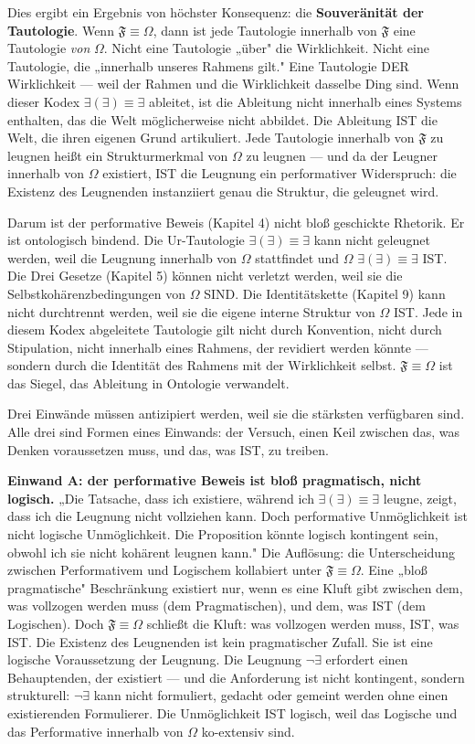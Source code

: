 \documentclass[10pt, openany, oneside]{book}
\begin{document}
Dies ergibt ein Ergebnis von höchster Konsequenz: die \textbf{Souveränität der Tautologie}. Wenn $\mathfrak{F} \equiv \Omega$, dann ist jede Tautologie innerhalb von $\mathfrak{F}$ eine Tautologie \textit{von} $\Omega$. Nicht eine Tautologie „über" die Wirklichkeit. Nicht eine Tautologie, die „innerhalb unseres Rahmens gilt." Eine Tautologie DER Wirklichkeit --- weil der Rahmen und die Wirklichkeit dasselbe Ding sind. Wenn dieser Kodex $\exists(\exists) \equiv \exists$ ableitet, ist die Ableitung nicht innerhalb eines Systems enthalten, das die Welt möglicherweise nicht abbildet. Die Ableitung IST die Welt, die ihren eigenen Grund artikuliert. Jede Tautologie innerhalb von $\mathfrak{F}$ zu leugnen heißt ein Strukturmerkmal von $\Omega$ zu leugnen --- und da der Leugner innerhalb von $\Omega$ existiert, IST die Leugnung ein performativer Widerspruch: die Existenz des Leugnenden instanziiert genau die Struktur, die geleugnet wird.

Darum ist der performative Beweis (Kapitel 4) nicht bloß geschickte Rhetorik. Er ist ontologisch bindend. Die Ur-Tautologie $\exists(\exists) \equiv \exists$ kann nicht geleugnet werden, weil die Leugnung innerhalb von $\Omega$ stattfindet und $\Omega$ $\exists(\exists) \equiv \exists$ IST. Die Drei Gesetze (Kapitel 5) können nicht verletzt werden, weil sie die Selbstkohärenzbedingungen von $\Omega$ SIND. Die Identitätskette (Kapitel 9) kann nicht durchtrennt werden, weil sie die eigene interne Struktur von $\Omega$ IST. Jede in diesem Kodex abgeleitete Tautologie gilt nicht durch Konvention, nicht durch Stipulation, nicht innerhalb eines Rahmens, der revidiert werden könnte --- sondern durch die Identität des Rahmens mit der Wirklichkeit selbst. $\mathfrak{F} \equiv \Omega$ ist das Siegel, das Ableitung in Ontologie verwandelt.

Drei Einwände müssen antizipiert werden, weil sie die stärksten verfügbaren sind. Alle drei sind Formen eines Einwands: der Versuch, einen Keil zwischen das, was Denken voraussetzen muss, und das, was IST, zu treiben.

\textbf{Einwand A: der performative Beweis ist bloß pragmatisch, nicht logisch.} „Die Tatsache, dass ich existiere, während ich $\exists(\exists) \equiv \exists$ leugne, zeigt, dass ich die Leugnung nicht vollziehen kann. Doch performative Unmöglichkeit ist nicht logische Unmöglichkeit. Die Proposition könnte logisch kontingent sein, obwohl ich sie nicht kohärent leugnen kann." Die Auflösung: die Unterscheidung zwischen Performativem und Logischem kollabiert unter $\mathfrak{F} \equiv \Omega$. Eine „bloß pragmatische" Beschränkung existiert nur, wenn es eine Kluft gibt zwischen dem, was vollzogen werden muss (dem Pragmatischen), und dem, was IST (dem Logischen). Doch $\mathfrak{F} \equiv \Omega$ schließt die Kluft: was vollzogen werden muss, IST, was IST. Die Existenz des Leugnenden ist kein pragmatischer Zufall. Sie ist eine logische Voraussetzung der Leugnung. Die Leugnung $\neg\exists$ erfordert einen Behauptenden, der existiert --- und die Anforderung ist nicht kontingent, sondern strukturell: $\neg\exists$ kann nicht formuliert, gedacht oder gemeint werden ohne einen existierenden Formulierer. Die Unmöglichkeit IST logisch, weil das Logische und das Performative innerhalb von $\Omega$ ko-extensiv sind.
\end{document}

